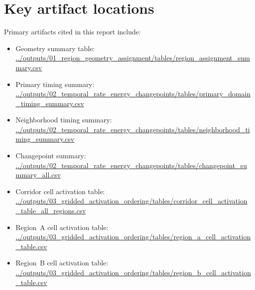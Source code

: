 \documentclass[11pt]{article}
\begin{document}
\section*{Key artifact locations}
Primary artifacts cited in this report include:
\begin{itemize}
    \item Geometry summary table: \url{../outputs/01_region_geometry_assignment/tables/region_assignment_summary.csv}
    \item Primary timing summary: \url{../outputs/02_temporal_rate_energy_changepoints/tables/primary_domain_timing_summary.csv}
    \item Neighborhood timing summary: \url{../outputs/02_temporal_rate_energy_changepoints/tables/neighborhood_timing_summary.csv}
    \item Changepoint summary: \url{../outputs/02_temporal_rate_energy_changepoints/tables/changepoint_summary_all.csv}
    \item Corridor cell activation table: \url{../outputs/03_gridded_activation_ordering/tables/corridor_cell_activation_table_all_regions.csv}
    \item Region~A cell activation table: \url{../outputs/03_gridded_activation_ordering/tables/region_a_cell_activation_table.csv}
    \item Region~B cell activation table: \url{../outputs/03_gridded_activation_ordering/tables/region_b_cell_activation_table.csv}
\end{itemize}
\end{document}
